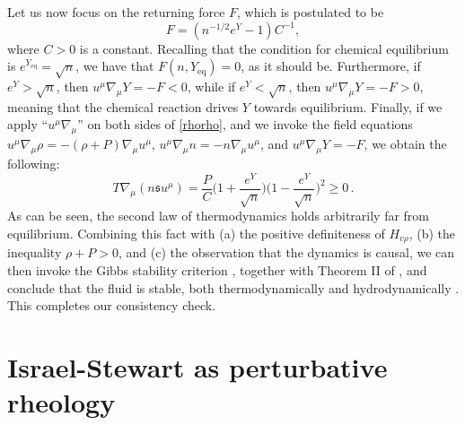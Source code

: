 \documentclass[aps,prl,noshowpacs,noshowkeys,floatfix,superscriptaddress,singlecolum,nofootinbib]{revtex4-2}
\theoremstyle{definition}
\theoremstyle{theorem}
\begin{document}
Let us now focus on the returning force $F$, which is postulated to be
\begin{equation}
   F=(n^{-1/2}e^Y-1)C^{-1}, 
\end{equation}
where $C>0$ is a constant. Recalling that the condition for chemical equilibrium is $e^{Y_{\text{eq}}}{=}\sqrt{n}$, we have that $F(n,Y_{\text{eq}})=0$, as it should be. Furthermore, if $e^Y{>}\sqrt{n}$, then $u^\mu \nabla_\mu Y{=}{-}F{<} 0$, while if $e^Y{<}\sqrt{n}$, then $u^\mu \nabla_\mu Y{=}{-}F {>} 0$, meaning that the chemical reaction drives $Y$ towards equilibrium. Finally, if we apply ``$u^\mu \nabla_\mu$'' on both sides of \eqref{rhorho}, and we invoke the field equations $u^\mu \nabla_\mu \rho=-(\rho+P)\nabla_\mu u^\mu$, $u^\mu \nabla_\mu n=-n\nabla_\mu u^\mu$, and $u^\mu \nabla_\mu Y=-F$, we obtain the following:
\begin{equation}\label{entropiesco}
    T\nabla_\mu (n\mathfrak{s}u^\mu)= \dfrac{P}{C} \bigg(1+\dfrac{e^Y}{\sqrt{n}}\bigg) \bigg( 1- \dfrac{e^{Y}}{\sqrt{n}}\bigg)^2 \geq 0 \, .
\end{equation}
As can be seen, the second law of thermodynamics holds arbitrarily far from equilibrium. Combining this fact with (a) the positive definiteness of $H_{v\rho}$, (b) the inequality $\rho+P>0$, and (c) the observation that the dynamics is causal, we can then invoke the Gibbs stability criterion \cite{GavassinoGibbs2021,GavassinoStabilityCarter2022}, together with Theorem II of \cite{GavassinoSuperluminal2021}, and conclude that the fluid is stable, both thermodynamically and hydrodynamically \cite{GavassinoCausality2021}. This completes our consistency check.




\newpage
\section{Israel-Stewart as perturbative rheology}
\end{document}
